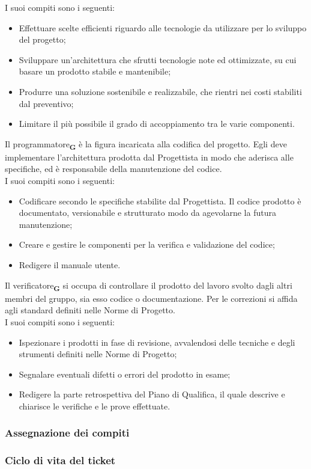 I suoi compiti sono i seguenti:
\begin {itemize}
    \item Effettuare scelte efficienti riguardo alle tecnologie da utilizzare per lo sviluppo del progetto;
    \item Sviluppare un'architettura che sfrutti tecnologie note ed ottimizzate, su cui basare un prodotto stabile e mantenibile;
    \item Produrre una soluzione sostenibile e realizzabile, che rientri nei costi stabiliti dal preventivo;
    \item Limitare il più possibile il grado di accoppiamento tra le varie componenti.
\end {itemize}
Il programmatore\textsubscript{\textbf{G}} è la figura incaricata alla codifica del progetto. Egli deve implementare l’architettura prodotta dal Progettista in modo che aderisca alle specifiche, ed è responsabile della manutenzione del codice.\\
I suoi compiti sono i seguenti:
\begin {itemize}
    \item Codificare secondo le specifiche stabilite dal Progettista. Il codice prodotto è documentato, versionabile e strutturato modo da agevolarne la futura manutenzione;
    \item Creare e gestire le componenti per la verifica e validazione del codice;
    \item Redigere il manuale utente.
\end {itemize}
Il verificatore\textsubscript{\textbf{G}} si occupa di controllare il prodotto del lavoro svolto dagli altri membri del gruppo, sia esso codice o documentazione. Per le correzioni si affida agli standard definiti nelle Norme di Progetto.\\
I suoi compiti sono i seguenti:
\begin {itemize}
    \item Ispezionare i prodotti in fase di revisione, avvalendosi delle tecniche e degli strumenti definiti nelle Norme di Progetto;
    \item Segnalare eventuali difetti o errori del prodotto in esame;
    \item Redigere la parte retrospettiva del Piano di Qualifica, il quale descrive e chiarisce le verifiche e le prove effettuate.
\end {itemize}
\subsubsection{Assegnazione dei compiti}
\subsubsection{Ciclo di vita del ticket}
